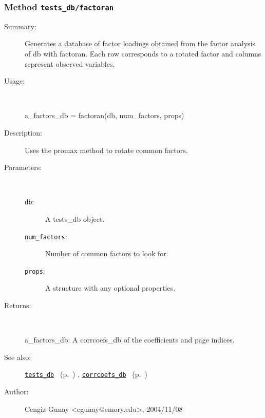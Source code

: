 \subsubsection[Method \texttt{factoran}]{Method \texttt{tests\_db/factoran}}%
%
\label{ref_tests_db__factoran}%
\hypertarget{ref_tests_db__factoran}{}%
\begin{description}
\item[Summary:]Generates a database of factor loadings obtained from the 
		factor analysis of db with factoran. Each row corresponds
		to a rotated factor and columns represent observed variables.
%
\item[Usage:]~%
\begin{lyxcode}%
a\_factors\_db = factoran(db, num\_factors, props)
%
\end{lyxcode}%
%
\item[Description:]%
Uses the promax method to rotate common factors.
\item[Parameters:]~
\begin{description}%
\item[\texttt{db}:]
 A tests\_db object.
\item[\texttt{num\_factors}:]
 Number of common factors to look for.
\item[\texttt{props}:]
 A structure with any optional properties.
\end{description}%
%
\item[Returns:]~

	a\_factors\_db: A corrcoefs\_db of the coefficients and page indices.
%
%
\item[See also:]%
\hyperlink{ref_tests_db}{\texttt{tests\_db}}%
\ (p.~\pageref{ref_tests_db})%
%
, \hyperlink{ref_corrcoefs_db}{\texttt{corrcoefs\_db}}%
\ (p.~\pageref{ref_corrcoefs_db})%
%
%
\item[Author:]%
Cengiz Gunay <cgunay@emory.edu>, 2004/11/08%
\end{description}
\methodline%
